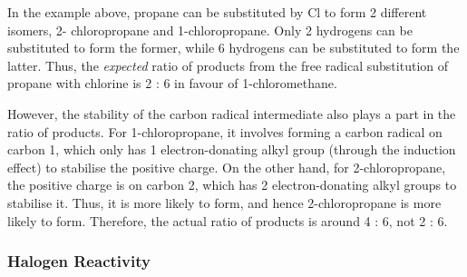 


				In the example above, propane can be substituted by Cl to form 2 different isomers, 2- chloropropane and 1-chloropropane.
				Only 2 hydrogens can be substituted to form the former, while 6 hydrogens can be substituted to form the latter. Thus, the
				\textit{expected} ratio of products from the free radical substitution of propane with chlorine is 2 : 6 in
				favour of 1-chloromethane.

				However, the stability of the carbon radical intermediate also plays a part in the ratio of products. For 1-chloropropane,
				it involves forming a carbon radical on carbon 1, which only has 1 electron-donating alkyl group (through the induction effect)
				to stabilise the positive charge. On the other hand, for 2-chloropropane, the positive charge is on carbon 2, which
				has 2 electron-donating alkyl groups to stabilise it. Thus, it is more likely to form, and hence 2-chloropropane is more
				likely to form.	Therefore, the actual ratio of products is around 4 : 6, not 2 : 6.



			\subsubsection{Halogen Reactivity}

